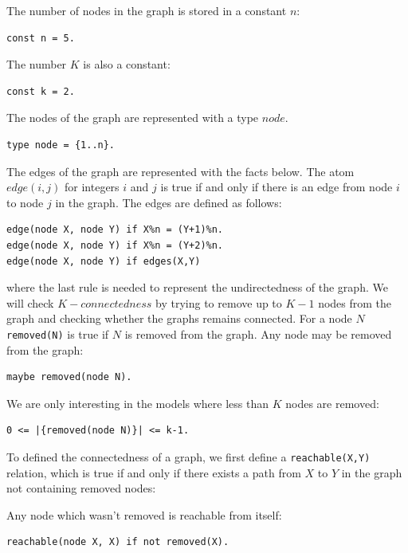 \documentclass[a4paper,10pt]{article}
\begin{document}
\medskip\noindent
The number of nodes in the graph is stored in a constant $n$:
\begin{verbatim}
const n = 5.
\end{verbatim}

\medskip\noindent
The number $K$ is also a constant:
\begin{verbatim}
const k = 2.
\end{verbatim} 

\medskip\noindent
The nodes of the graph are represented with a type $node$.

\begin{verbatim}
type node = {1..n}.
\end{verbatim}


\medskip\noindent
The edges of the graph are represented with the facts below. The atom $edge(i,j)$ for integers $i$ and $j$ is true if and only if there is an edge from node $i$ to node $j$ in the graph. The edges are defined as follows:

\begin{verbatim}
edge(node X, node Y) if X%n = (Y+1)%n.
edge(node X, node Y) if X%n = (Y+2)%n.
edge(node X, node Y) if edges(X,Y) 
\end{verbatim}

\noindent
where the last rule is needed to represent the undirectedness of the graph.
\medskip\noindent
We will check $K-connectedness$ by trying to remove up to $K-1$ nodes from the graph and checking whether the graphs remains connected.
For a node $N$ \texttt{removed(N)} is true if $N$ is removed from the graph. Any node may be removed from the graph:

\begin{verbatim}
maybe removed(node N).
\end{verbatim}   

\medskip\noindent
We are only interesting in the models where less than $K$ nodes are removed:

\begin{verbatim}
0 <= |{removed(node N)}| <= k-1.
\end{verbatim}

\medskip\noindent
To defined the connectedness of a graph, we first define a \texttt{reachable(X,Y)} relation, which is true if and only if there exists a path from $X$ to $Y$ in the graph not containing removed nodes:

\medskip\noindent
Any node which wasn't removed is reachable from itself:
\begin{verbatim}
reachable(node X, X) if not removed(X).
\end{verbatim}
\end{document}
